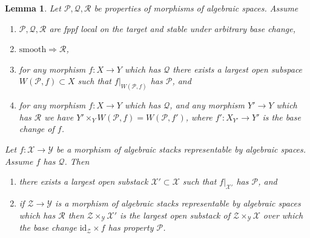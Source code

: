 \documentclass{stacks-project}
\theoremstyle{plain}
\newtheorem{lemma}[subsection]{Lemma}
\theoremstyle{definition}
\theoremstyle{remark}
\numberwithin{equation}{subsection}
\begin{document}
\begin{lemma}
\label{lemma-local-source}
Let $\mathcal{P}, \mathcal{Q}, \mathcal{R}$ be properties of morphisms
of algebraic spaces. Assume
\begin{enumerate}
\item $\mathcal{P}, \mathcal{Q}, \mathcal{R}$ are fppf local on the target
and stable under arbitrary base change,
\item $\text{smooth} \Rightarrow \mathcal{R}$,
\item for any morphism $f : X \to Y$ which has $\mathcal{Q}$ there exists a
largest open subspace $W(\mathcal{P}, f) \subset X$ such that
$f|_{W(\mathcal{P}, f)}$ has $\mathcal{P}$, and
\item for any morphism $f : X \to Y$ which has $\mathcal{Q}$,
and any morphism $Y' \to Y$ which has $\mathcal{R}$ we have
$Y' \times_Y W(\mathcal{P}, f) = W(\mathcal{P}, f')$, where
$f' : X_{Y'} \to Y'$ is the base change of $f$.
\end{enumerate}
Let $f : \mathcal{X} \to \mathcal{Y}$ be a morphism of algebraic stacks
representable by algebraic spaces. Assume $f$ has $\mathcal{Q}$. Then
\begin{enumerate}
\item[(A)] there exists a largest open substack
$\mathcal{X}' \subset \mathcal{X}$ such that $f|_{\mathcal{X}'}$ has
$\mathcal{P}$, and
\item[(B)] if $\mathcal{Z} \to \mathcal{Y}$ is a morphism of algebraic
stacks representable by algebraic spaces which has $\mathcal{R}$
then $\mathcal{Z} \times_\mathcal{Y} \mathcal{X}'$ is the largest open
substack of $\mathcal{Z} \times_\mathcal{Y} \mathcal{X}$ over which
the base change $\text{id}_\mathcal{Z} \times f$ has property $\mathcal{P}$.
\end{enumerate}
\end{lemma}
\end{document}
